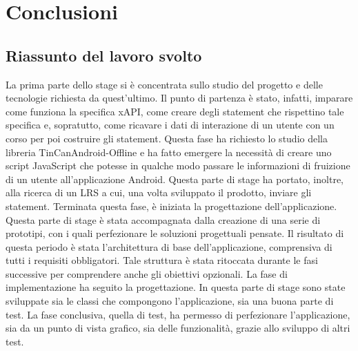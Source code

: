 \documentclass[../Tesi.tex]{subfiles}
\begin{document}
\section{Conclusioni}
	\subsection{Riassunto del lavoro svolto}
	La prima parte dello stage si è concentrata sullo studio del progetto e delle tecnologie richiesta da quest'ultimo. Il punto di partenza è stato, infatti, imparare come funziona la specifica xAPI, come creare degli statement che rispettino tale specifica e, sopratutto, come ricavare i dati di interazione di un utente con un corso per poi costruire gli statement. Questa fase ha richiesto lo studio della libreria TinCanAndroid-Offline e ha fatto emergere la necessità di creare uno script JavaScript che potesse in qualche modo passare le informazioni di fruizione di un utente all'applicazione Android. Questa parte di stage ha portato, inoltre, alla ricerca di un LRS a cui, una volta sviluppato il prodotto, inviare gli statement. Terminata questa fase, è iniziata la progettazione dell'applicazione. Questa parte di stage è stata accompagnata dalla creazione di una serie di prototipi, con i quali perfezionare le soluzioni progettuali pensate. Il risultato di questa periodo è stata l'architettura di base dell'applicazione, comprensiva di tutti i requisiti obbligatori. Tale struttura è stata ritoccata durante le fasi successive per comprendere anche gli obiettivi opzionali. La fase di implementazione ha seguito la progettazione. In questa parte di stage sono state sviluppate sia le classi che compongono l'applicazione, sia una buona parte di test. La fase conclusiva, quella di test, ha permesso di perfezionare l'applicazione, sia da un punto di vista grafico, sia delle funzionalità, grazie allo sviluppo di altri test.\\
\end{document}
